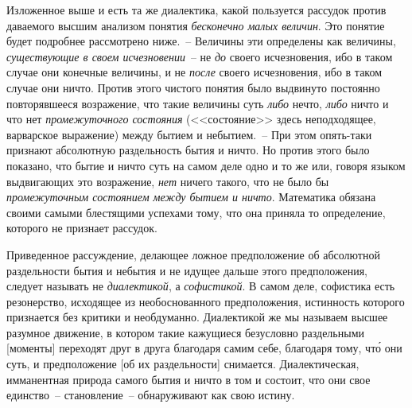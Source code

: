 Изложенное выше и есть та же диалектика, какой
пользуется рассудок против даваемого высшим анализом
понятия \emph{бесконечно малых величин}. Это понятие будет
подробнее рассмотрено ниже.~-- Величины эти определены
как величины, \emph{существующие в своем исчезновении}~--
не \emph{до} своего исчезновения, ибо в таком случае они конечные
величины, и не \emph{после} своего исчезновения, ибо в таком
случае они ничто. Против этого чистого понятия
было выдвинуто постоянно повторявшееся возражение,
что такие величины суть \emph{либо} нечто, \emph{либо} ничто и что
нет \emph{промежуточного состояния} (<<состояние>> здесь неподходящее,
варварское выражение) между бытием и небытием.~--
При этом опять-таки признают абсолютную раздельность
бытия и ничто. Но против этого было показано,
что бытие и ничто суть на самом деле одно и то же или,
говоря языком выдвигающих это возражение, \emph{нет} ничего
такого, что не было бы \emph{промежуточным состоянием между
бытием и ничто}. Математика обязана своими самыми блестящими
успехами тому, что она приняла то определение,
которого не признает рассудок.

Приведенное рассуждение, делающее ложное предположение
об абсолютной раздельности бытия и небытия и
не идущее дальше этого предположения, следует называть
не \emph{диалектикой}, а \emph{софистикой}. В самом деле, софистика
есть резонерство, исходящее из необоснованного предположения,
истинность которого признается без критики и
необдуманно. Диалектикой же мы называем высшее разумное
движение, в котором такие кажущиеся безусловно
раздельными [моменты] переходят друг в друга благодаря
самим себе, благодаря тому, чт\'о они суть, и предположение
[об их раздельности] снимается. Диалектическая, имманентная
природа самого бытия и ничто в том и состоит,
что они свое единство~-- становление~-- обнаруживают
как свою истину.


